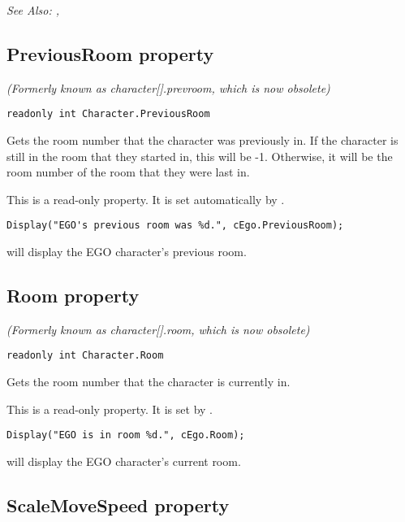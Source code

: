 \it{See Also:} ,


\subsection{PreviousRoom property}\label{Character.PreviousRoom}%

\it{(Formerly known as character[].prevroom, which is now obsolete)}

\begin{verbatim}
readonly int Character.PreviousRoom
\end{verbatim}
Gets the room number that the character was previously in. If the character is still
in the room that they started in, this will be -1. Otherwise, it will be the room number
of the room that they were last in.

This is a read-only property. It is set automatically by .

\begin{verbatim}
Display("EGO's previous room was %d.", cEgo.PreviousRoom);
\end{verbatim}
will display the EGO character's previous room.


\subsection{Room property}\label{Character.Room}%

\it{(Formerly known as character[].room, which is now obsolete)}

\begin{verbatim}
readonly int Character.Room
\end{verbatim}
Gets the room number that the character is currently in.

This is a read-only property. It is set by .

\begin{verbatim}
Display("EGO is in room %d.", cEgo.Room);
\end{verbatim}
will display the EGO character's current room.


\subsection{ScaleMoveSpeed property}\label{Character.ScaleMoveSpeed}%

